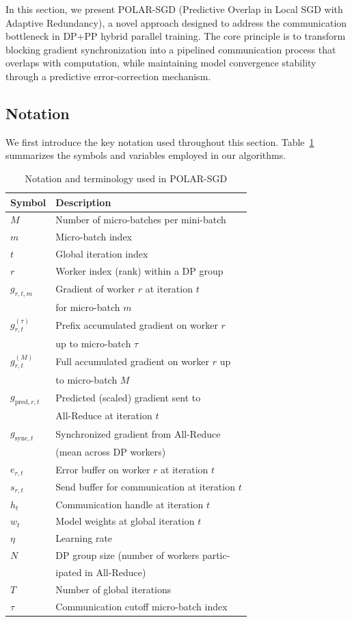 \label{sec:design}

In this section, we present POLAR-SGD (Predictive Overlap in Local SGD with Adaptive Redundancy), a novel approach designed to address the communication bottleneck in DP+PP hybrid parallel training. The core principle is to transform blocking gradient synchronization into a pipelined communication process that overlaps with computation, while maintaining model convergence stability through a predictive error-correction mechanism.

\subsection{Notation}

We first introduce the key notation used throughout this section. Table~\ref{tab:notation} summarizes the symbols and variables employed in our algorithms.

\begin{table}[ht]
\centering
\caption{Notation and terminology used in POLAR-SGD}
\label{tab:notation}
\begin{tabular}{ll}
\hline
\textbf{Symbol} & \textbf{Description} \\
\hline
$M$ 
& Number of micro-batches per mini-batch \\
$m$
& Micro-batch index \\
$t$ 
& Global iteration index \\
$r$ 
& Worker index (rank) within a DP group \\
$g_{r,t,m}$ 
& Gradient of worker $r$ at iteration $t$ \\
& for micro-batch $m$ \\
$g_{r,t}^{(\tau)}$      
& Prefix accumulated gradient on worker $r$ \\
& up to micro-batch $\tau$ \\
$g_{r,t}^{(M)}$         
& Full accumulated gradient on worker $r$ up \\
& to micro-batch $M$ \\
$g_{\mathrm{pred},r,t}$ 
& Predicted (scaled) gradient sent to \\
& All-Reduce at iteration $t$ \\
$g_{\mathrm{sync},t}$ 
& Synchronized gradient from All-Reduce \\
& (mean across DP workers) \\
$e_{r,t}$ 
& Error buffer on worker $r$ at iteration $t$ \\
$s_{r,t}$ 
& Send buffer for communication at iteration $t$ \\
$h_t$ 
& Communication handle at iteration $t$ \\
$w_t$ 
& Model weights at global iteration $t$ \\
$\eta$ 
& Learning rate \\
$N$ 
& DP group size (number of workers partic- \\
& ipated in All-Reduce) \\
$T$ 
& Number of global iterations \\
$\tau$ 
& Communication cutoff micro-batch index \\
\hline
\end{tabular}
\end{table}

